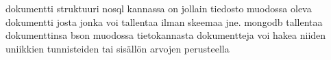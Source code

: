 

dokumentti struktuuri nosql kannassa on jollain tiedosto muodossa oleva dokumentti josta jonka voi tallentaa ilman skeemaa jne.
mongodb tallentaa dokumenttinsa bson muodossa
tietokannasta dokumentteja voi hakea niiden uniikkien tunnisteiden tai sisällön arvojen perusteella
\medskip


















    





